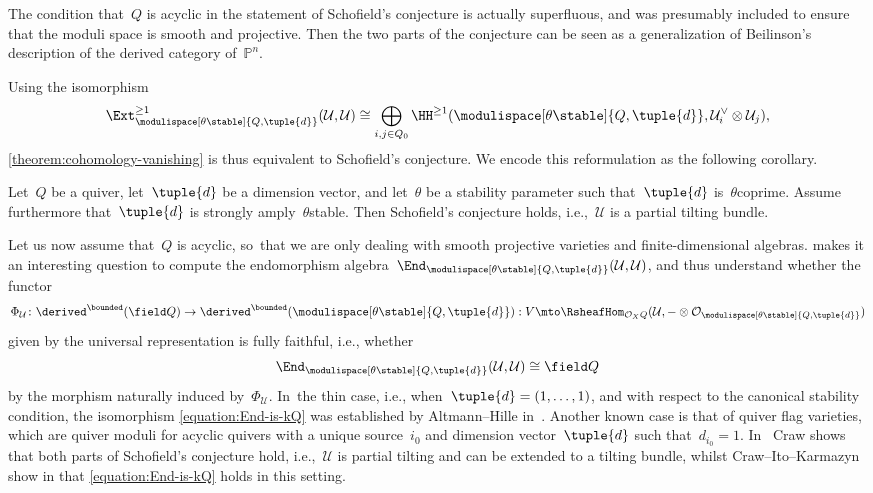 The condition that~$Q$ is acyclic in the statement of Schofield's conjecture
is actually superfluous,
and was presumably included to ensure that the moduli space is smooth and projective.
Then the two parts of the conjecture can be seen as a generalization
of Beilinson's description of the derived category of~$\mathbb{P}^n$.

Using the isomorphism
\begin{equation}
\label{equation:Ext-as-cohomology}
\Ext_{\modulispace[\theta\stable]{Q,\tuple{d}}}^{\geq 1}(\mathcal{U},\mathcal{U})
\cong\bigoplus_{i,j\in Q_0}\HH^{\geq 1}(\modulispace[\theta\stable]{Q,\tuple{d}},\mathcal{U}_i^\vee\otimes\mathcal{U}_j),
\end{equation}
\cref{theorem:cohomology-vanishing}
is thus equivalent to Schofield's conjecture.
We encode this reformulation as the following corollary.

\begin{alphacorollary}
\label{corollary:schofield}
Let~$Q$ be a quiver,
let~$\tuple{d}$ be a dimension vector,
and let~$\theta$ be a stability parameter
such that~$\tuple{d}$ is~$\theta$\dash coprime.
Assume furthermore that~$\tuple{d}$ is strongly amply~$\theta$\dash stable.
Then Schofield's conjecture holds,
i.e.,~$\mathcal{U}$ is a partial tilting bundle.
\end{alphacorollary}

Let us now assume that~$Q$ is acyclic, so~that we are only dealing with smooth projective varieties
and finite-dimensional algebras.
 makes it an interesting question to
compute the endomorphism algebra~$\End_{\modulispace[\theta\stable]{Q,\tuple{d}}}(\mathcal{U},\mathcal{U})$,
and thus understand whether the functor
\begin{equation}
\label{equation:fully-faithful-functor}
\Phi_{\mathcal{U}}\colon
\derived^\bounded(\field Q)\to\derived^\bounded(\modulispace[\theta\stable]{Q,\tuple{d}}):
V\mto\RsheafHom_{\mathcal{O}_XQ}(\mathcal{U},-\otimes\mathcal{O}_{\modulispace[\theta\stable]{Q,\tuple{d}}})
\end{equation}
given by the universal representation is fully faithful,
i.e.,
whether
\begin{equation}
\label{equation:End-is-kQ}
\End_{\modulispace[\theta\stable]{Q,\tuple{d}}}(\mathcal{U},\mathcal{U})
\cong
\field Q
\end{equation}
by the morphism naturally induced by~$\Phi_{\mathcal{U}}$. In~the thin case,
i.e.,
when~$\tuple{d}=(1,\ldots,1)$,
and with respect to the canonical stability condition,
the isomorphism \eqref{equation:End-is-kQ} was established by Altmann--Hille in~\cite[Th.\,1.3]{MR1688469}.
Another known case is that of quiver flag varieties,
which are quiver moduli for acyclic quivers with a unique source~$i_0$
and dimension vector~$\tuple{d}$ such that~$d_{i_0}=1$. In~\cite[Th.\,1.2]{MR2772068} Craw shows that both parts of Schofield's conjecture hold,
i.e.,~$\mathcal{U}$ is partial tilting and can be extended to a tilting bundle,
whilst Craw--Ito--Karmazyn show in \cite[Ex.\,2.9]{MR3803802}
that \eqref{equation:End-is-kQ} holds in this setting.


